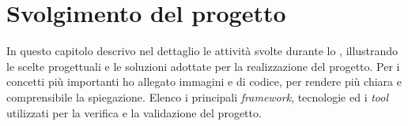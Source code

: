 \chapter{Svolgimento del progetto}
\label{cap:svolgimentodelprogetto}

In questo capitolo descrivo nel dettaglio le attività svolte durante lo \stage,
illustrando le scelte progettuali e le soluzioni adottate per la realizzazione del progetto.
Per i concetti più importanti ho allegato immagini e \snippet{} di codice, per rendere più chiara e comprensibile la spiegazione.
Elenco i principali \textit{framework}, tecnologie ed i \textit{tool} utilizzati per la verifica e la validazione del progetto.





